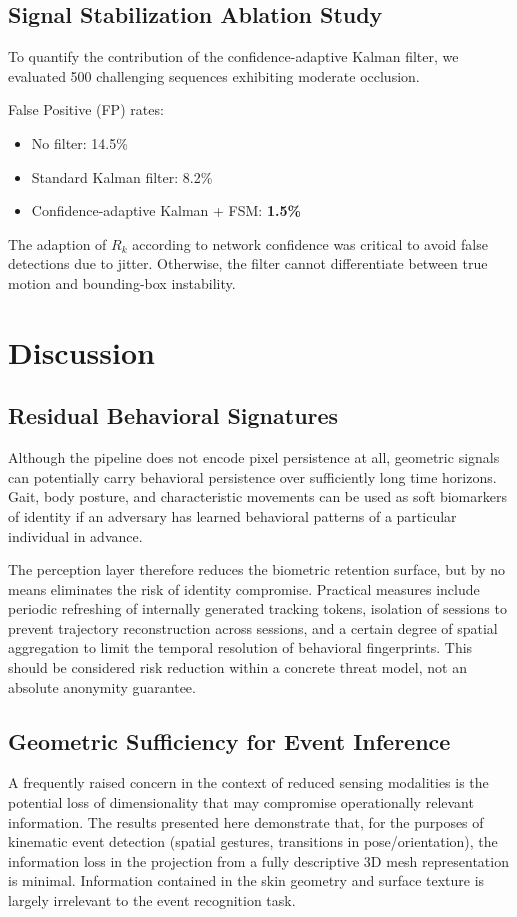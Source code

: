 \documentclass[conference]{IEEEtran}
\begin{document}
\subsection{Signal Stabilization Ablation Study}
To quantify the contribution of the confidence-adaptive Kalman filter, we evaluated 500 challenging sequences exhibiting moderate occlusion. 

False Positive (FP) rates:
\begin{itemize}
    \item No filter: 14.5\%
    \item Standard Kalman filter: 8.2\%
    \item Confidence-adaptive Kalman + FSM: \textbf{1.5\%}
\end{itemize}

The adaption of $R_k$ according to network confidence was critical to avoid false detections due to jitter. Otherwise, the filter cannot differentiate between true motion and bounding-box instability.

\section{Discussion}

\subsection{Residual Behavioral Signatures}
Although the pipeline does not encode pixel persistence at all, geometric signals can potentially carry behavioral persistence over sufficiently long time horizons. Gait, body posture, and characteristic movements can be used as soft biomarkers of identity if an adversary has learned behavioral patterns of a particular individual in advance.

The perception layer therefore reduces the biometric retention surface, but by no means eliminates the risk of identity compromise. Practical measures include periodic refreshing of internally generated tracking tokens, isolation of sessions to prevent trajectory reconstruction across sessions, and a certain degree of spatial aggregation to limit the temporal resolution of behavioral fingerprints. This should be considered risk reduction within a concrete threat model, not an absolute anonymity guarantee.

\subsection{Geometric Sufficiency for Event Inference}
A frequently raised concern in the context of reduced sensing modalities is the potential loss of dimensionality that may compromise operationally relevant information. The results presented here demonstrate that, for the purposes of kinematic event detection (spatial gestures, transitions in pose/orientation), the information loss in the projection from a fully descriptive 3D mesh representation is minimal. Information contained in the skin geometry and surface texture is largely irrelevant to the event recognition task.
\end{document}
